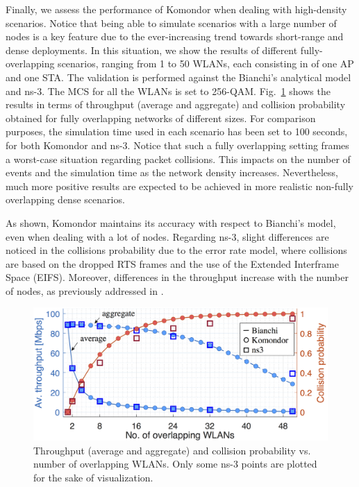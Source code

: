 \documentclass{article}
\begin{document}
	Finally, we assess the performance of Komondor when dealing with high-density scenarios. Notice that being able to simulate scenarios with a large number of nodes is a key feature due to the ever-increasing trend towards short-range and dense deployments. In this situation, we show the results of different fully-overlapping scenarios, ranging from 1 to 50 WLANs, each consisting in of one AP and one STA. The validation is performed against the Bianchi's analytical model and ns-3. The MCS for all the WLANs is set to 256-QAM. Fig.~\ref{fig:results_high_density_scenarios_throughput} shows the results in terms of throughput (average and aggregate) and collision probability obtained for fully overlapping networks of different sizes. For comparison purposes, the simulation time used in each scenario has been set to 100 seconds, for both Komondor and ns-3. Notice that such a fully overlapping setting frames a worst-case situation regarding packet collisions. This impacts on the number of events and the simulation time as the network density increases. Nevertheless, much more positive results are expected to be achieved in more realistic non-fully overlapping dense scenarios.
	
	As shown, Komondor maintains its accuracy with respect to Bianchi's model, even when dealing with a lot of nodes. Regarding ns-3, slight differences are noticed in the collisions probability due to the error rate model, where collisions are based on the dropped RTS frames and the use of the Extended Interframe Space (EIFS). Moreover, differences in the throughput increase with the number of nodes, as previously addressed in \cite{patidar2017validation}.
	
	\begin{figure}[t]
		\centering	
		\includegraphics[width=.8\columnwidth]{results_scenario_3.png}
		\caption{Throughput (average and aggregate) and collision probability vs. number of overlapping WLANs. Only some ns-3 points are plotted for the sake of visualization.}
		\label{fig:results_high_density_scenarios_throughput}
	\end{figure}
	\label{section:density}
	
\end{document}
